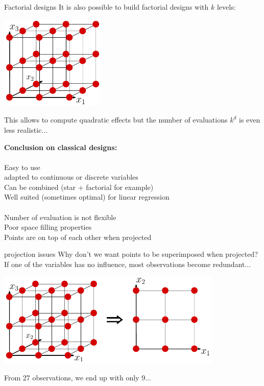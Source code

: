 \documentclass{beamer}
\begin{document}
\begin{frame}{Factorial designs}
It is also possible to build factorial designs with $k$ levels:
\begin{center}
\includegraphics[width=5cm]{figures/latexdraw/factorial3levels}
\end{center}
This allows to compute quadratic effects but the number of evaluations $k^d$ is even less realistic...
\end{frame}

\begin{frame}{}
\textbf{Conclusion on classical designs:}\\
\\
\quad Easy to use\\
\quad adapted to continuous or discrete variables\\
\quad Can be combined (star + factorial for example)\\
\quad Well suited (sometimes optimal) for linear regression\\
\vspace{5mm}
\\
\quad Number of evaluation is not flexible\\
\quad Poor space filling properties\\
\quad Points are on top of each other when projected
\end{frame}

\begin{frame}{projection issues}
Why don't we want points to be superimposed when projected?\\
If one of the variables has no influence, most observations become redundant...
\begin{center}
\includegraphics[height=4.5cm]{figures/latexdraw/factorialprojection}
\end{center}
From 27 observations, we end up with only 9...
\end{frame}
\end{document}
